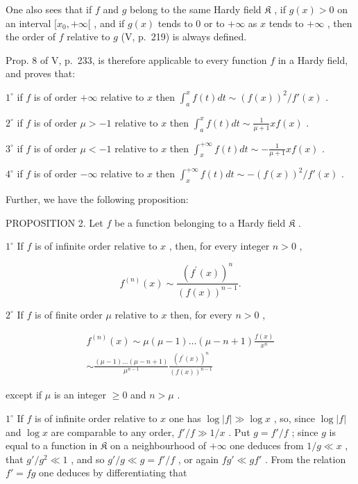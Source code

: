 One also sees that if \(f\) and \(g\) belong to the same Hardy field \(\mathfrak{K}\) , if \(g(x) > 0\) on an interval \([x_0, +\infty[\) , and if \(g(x)\) tends to 0 or to \(+\infty\) as \(x\) tends to \(+\infty\) , then the order of \(f\) relative to \(g\) (V, p.~219) is always defined.

Prop. 8 of V, p.~233, is therefore applicable to every function \(f\) in a Hardy field, and proves that:

\(1^{\circ}\) if \(f\) is of order \(+\infty\) relative to \(x\) then \(\int_{a}^{x} f(t) dt \sim (f(x))^{2} / f'(x)\) .

\(2^{\circ}\) if \(f\) is of order \(\mu > -1\) relative to \(x\) then \(\int_{a}^{x} f(t) dt \sim \frac{1}{\mu + 1} xf(x)\) .

\(3^{\circ}\) if \(f\) is of order \(\mu < -1\) relative to \(x\) then \(\int_{x}^{+\infty} f(t) dt \sim -\frac{1}{\mu + 1} xf(x)\) .

\(4^{\circ}\) if \(f\) is of order \(-\infty\) relative to \(x\) then \(\int_{x}^{+\infty} f(t) dt \sim -(f(x))^{2} / f'(x)\) .

Further, we have the following proposition:

PROPOSITION 2. Let \(f\) be a function belonging to a Hardy field \(\mathfrak{K}\) .

\(1^{\circ}\) If \(f\) is of infinite order relative to \(x\) , then, for every integer \(n > 0\) ,

\[
f ^ {(n)} (x) \sim \frac {(f ^ {\prime} (x)) ^ {n}}{(f (x)) ^ {n - 1}}.\tag{2}
\]

\(2^{\circ}\) If \(f\) is of finite order \(\mu\) relative to \(x\) then, for every \(n > 0\) ,

\[
\begin{array}{c} f ^ {(n)} (x) \sim \mu (\mu - 1) \ldots (\mu - n + 1) \frac {f (x)}{x ^ {n}} \\ \sim \frac {(\mu - 1) \ldots (\mu - n + 1)}{\mu^ {n - 1}} \frac {(f ^ {\prime} (x)) ^ {n}}{(f (x)) ^ {n - 1}} \end{array}\tag{3}
\]

except if \(\mu\) is an integer \(\geqslant 0\) and \(n > \mu\) .

\(1^{\circ}\) If \(f\) is of infinite order relative to \(x\) one has \(\log |f| \gg \log x\) , so, since \(\log |f|\) and \(\log x\) are comparable to any order, \(f'/f \gg 1/x\) . Put \(g = f'/f\) ; since \(g\) is equal to a function in \(\mathfrak{K}\) on a neighbourhood of \(+\infty\) one deduces from \(1/g \ll x\) , that \(g'/g^{2} \ll 1\) , and so \(g'/g \ll g = f'/f\) , or again \(fg' \ll gf'\) . From the relation \(f' = fg\) one deduces by differentiating that

